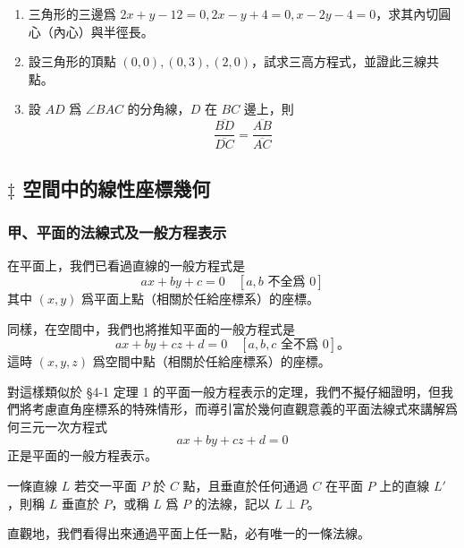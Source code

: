 \begin{enumerate}
\begin{figure}[H]
  \caption{四邊形中點聯成平行四邊形}
  \label{fig:4-64}
  \end{figure}

\item 三角形的三邊爲 $2x + y - 12 = 0, 2x - y + 4 = 0, x - 2y - 4 = 0$，求其內切圓心（內心）與半徑長。

\item 設三角形的頂點 $(0, 0), (0, 3), (2, 0)$，試求三高方程式，並證此三線共點。

\item 設 $AD$ 爲 $\angle BAC$ 的分角線，$D$ 在 $BC$ 邊上，則
\[
\frac{\overline{BD}}{\overline{DC}} = \frac{\overline{AB}}{\overline{AC}}
\]
\end{enumerate}


\subsection{\texorpdfstring{$\ddagger$ }{‡ }空間中的線性座標幾何}
\label{sec:4-8}

\subsubsection*{甲、平面的法線式及一般方程表示}

在平面上，我們已看過直線的一般方程式是
\[
ax + by + c = 0 \quad [a, b \text{ 不全爲 } 0]
\]
其中 $(x, y)$ 爲平面上點（相關於任給座標系）的座標。

同樣，在空間中，我們也將推知平面的一般方程式是
\begin{equation}
ax + by + cz + d = 0 \quad [a, b, c \text{ 全不爲 } 0]\text{。}
\label{eq:b3-4-44}
\end{equation}
這時 $(x, y, z)$ 爲空間中點（相關於任給座標系）的座標。

對這樣類似於 \S 4-1 定理 1 的平面一般方程表示的定理，我們不擬仔細證明，但我們將考慮直角座標系的特殊情形，而導引富於幾何直觀意義的平面法線式來講解爲何三元一次方程式
\[
ax + by + cz + d = 0
\]
正是平面的一般方程表示。

\begin{definition}
一條直線 $L$ 若交一平面 $P$ 於 $C$ 點，且垂直於任何通過 $C$ 在平面 $P$ 上的直線 $L'$，則稱 $L$ 垂直於 $P$，或稱 $L$ 爲 $P$ 的法線，記以 $L \perp P$。
\end{definition}

直觀地，我們看得出來通過平面上任一點，必有唯一的一條法線。


